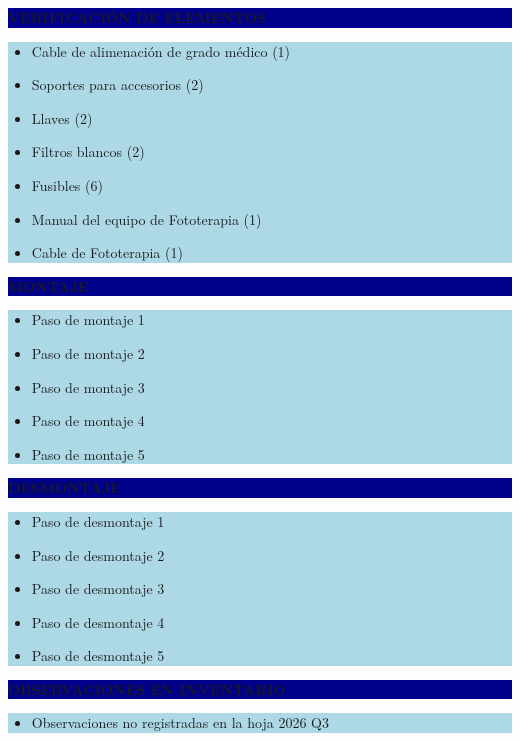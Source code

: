 \documentclass[11pt]{article}
\newcommand{\seccionbanda}[1]{%
  \vspace{0.6em}
  \noindent\colorbox{darkblue}{\parbox{\dimexpr\linewidth-2\fboxsep}{%
    \centering\color{white}\bfseries #1}}\par\vspace{0.6em}
}
\begin{document}
\newpage
\seccionbanda{VERIFICACIÓN DE ELEMENTOS}
\noindent\colorbox{lightblue}{\parbox{\dimexpr\linewidth-2\fboxsep\relax}{%
\begin{itemize}[label=$\square$, itemsep=4pt]
\item Cable de alimenación de grado médico (1)
\item Soportes para accesorios (2)
\item Llaves (2)
\item Filtros blancos (2)
\item Fusibles (6)
\item Manual del equipo de Fototerapia (1)
\item Cable de Fototerapia (1)
\end{itemize}
}}\par

\seccionbanda{MONTAJE}
\noindent\colorbox{lightblue}{\parbox{\dimexpr\linewidth-2\fboxsep\relax}{%
\begin{itemize}[label=$\square$, itemsep=4pt]
\item Paso de montaje 1
\item Paso de montaje 2
\item Paso de montaje 3
\item Paso de montaje 4
\item Paso de montaje 5
\end{itemize}
}}\par

\seccionbanda{DESMONTAJE}
\noindent\colorbox{lightblue}{\parbox{\dimexpr\linewidth-2\fboxsep\relax}{%
\begin{itemize}[label=$\square$, itemsep=4pt]
\item Paso de desmontaje 1
\item Paso de desmontaje 2
\item Paso de desmontaje 3
\item Paso de desmontaje 4
\item Paso de desmontaje 5
\end{itemize}
}}\par
\seccionbanda{OBSERVACIONES EN INVENTARIO}
\noindent\colorbox{lightblue}{\parbox{\dimexpr\linewidth-2\fboxsep\relax}{\begin{itemize}[itemsep=4pt]
\item Observaciones no registradas en la hoja 2026 Q3
\end{itemize}}}\par
\end{document}
